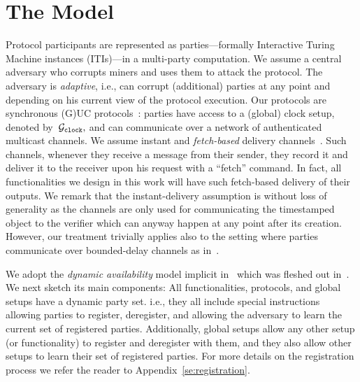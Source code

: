 \section{The Model}

Protocol participants are represented as parties---formally Interactive Turing Machine instances (ITIs)---in a multi-party computation. We assume a central adversary who  corrupts miners and  uses them to attack the protocol. The adversary is {\em adaptive}, i.e., can corrupt (additional) parties  at any point  and depending on his current view of the protocol execution. Our protocols are synchronous (G)UC protocols~\cite{C:BMTZ17,TCC:KMTZ13}:  parties have access to  a (global) clock setup, denoted by~$\mathcal{G}_{\mathtt{clock}},$ and can communicate over a network of authenticated multicast channels. We assume instant and {\em fetch-based}  delivery channels~\cite{TCC:KMTZ13,AC:CGHZ16}. Such channels, whenever they receive a message from their sender, they record it and deliver it to the receiver upon his request with a ``fetch'' command. In fact, all functionalities we design in this work will have such  fetch-based delivery of their outputs. We remark that the instant-delivery assumption is without loss of generality as the channels are only used for communicating the timestamped object to the verifier which can anyway happen at any point after its creation. However, our treatment trivially applies also to the setting where parties communicate over  bounded-delay channels as in~\cite{C:BMTZ17}. 


We adopt the {\em dynamic availability} model implicit in~\cite{C:BMTZ17} which was fleshed out in~\cite{CCS:BGKRZ18}. We next sketch its main components: All functionalities, protocols, and global setups have a dynamic party set. i.e., they all include special instructions allowing parties to register,  deregister, and allowing the adversary to learn the current set of registered parties. Additionally,  global setups allow any other setup (or functionality) to register and deregister with them, and they also allow other setups to learn their set of registered parties. For more details on the registration process we refer the reader to Appendix~\ref{se:registration}.  
